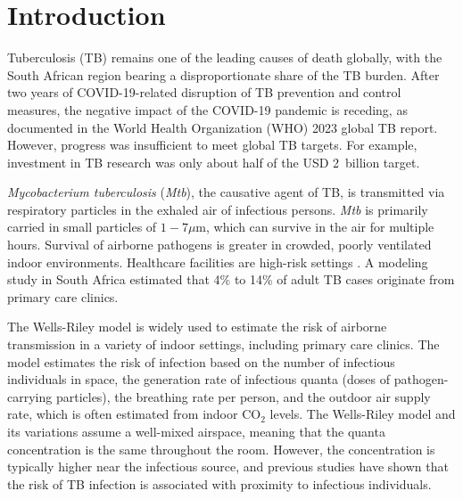 \documentclass[fleqn,11pt]{wlscirep}
\begin{document}
\section*{Introduction} 

Tuberculosis (TB) remains one of the leading causes of death globally, with the South African region bearing a disproportionate share of the TB burden.  After two years of COVID-19-related disruption of TB prevention and control measures, the negative impact of the COVID-19 pandemic is receding, as documented in the World Health Organization (WHO) 2023 global TB report\cite{WHO2023TBReport}. However, progress was insufficient to meet global TB targets\cite{WHO2023TBReport}. For example, investment in TB research was only about half of the USD 2~billion target\cite{WHO2023TBReport}.

\emph{Mycobacterium tuberculosis} (\emph{Mtb}), the causative agent of TB, is transmitted via respiratory particles in the exhaled air of infectious persons\cite{Rieder1999,Patterson2021Tuberculosis}. \emph{Mtb} is primarily carried in small particles of $1-7\mu$m\cite{Fennelly2020Lancet}, which can survive in the air for multiple hours\cite{Loudon1969AMRRD}. Survival of airborne pathogens is greater in crowded, poorly ventilated indoor environments\cite{Rieder1999,CPS2013Book,Nardell1991ARRD,Wang2021Science,Morawska2021}. Healthcare facilities are high-risk settings \cite{McCreesh2020IJTLD}. A modeling study in South Africa estimated that 4\% to 14\% of adult TB cases originate from primary care clinics\cite{McCreesh2022BMJGlobalHealth}.

The Wells-Riley model\cite{Riley1961Book} is widely used to estimate the risk of airborne transmission in a variety of indoor settings\cite{Haddrell2024NatCommun,Andrews2014JID,Taylor2016IJTLD,Hella2017JInfect,Zemouri2020JDR}, including primary care clinics\cite{Zurcher2022JID,McCreesh2021BMJGlobalHealth}. The model estimates the risk of infection based on the number of infectious individuals in space, the generation rate of infectious quanta (doses of pathogen-carrying particles), the breathing rate per person, and the outdoor air supply rate, which is often estimated from indoor CO$_2$ levels\cite{Rudnick2003IndoorAir,Richardson2014PONE,Haddrell2024NatCommun}. The Wells-Riley model and its variations\cite{Rudnick2003IndoorAir} assume a well-mixed airspace, meaning that the quanta concentration is the same throughout the room. However, the concentration is typically higher near the infectious source\cite{Wang2021Science,Vuorinen2020SafSci,Chen2020BuildEnv}, and previous studies have shown that the risk of TB infection is associated with proximity to infectious individuals\cite{Ko2004RiskAnal,Kenyon1996NEJM}.
\end{document}

